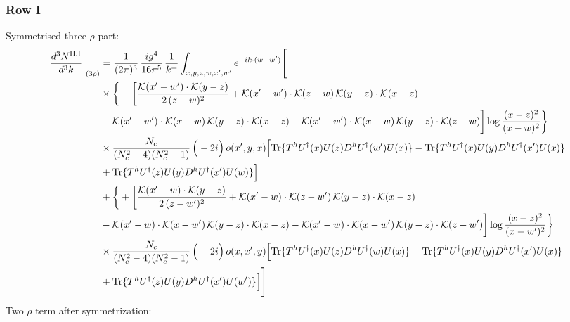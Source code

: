 \documentclass[9pt]{article}
\numberwithin{equation}{section}
\begin{document}
\subsubsection*{Row I}
Symmetrised three-$\rho$ part:
\begin{align}
\frac{d^{3}N^{\rm II.I}}{d^{3}k}\bigg|_{(3\rho)}&=\frac{1}{(2\pi)^{3}}\,\frac{ig^{4}}{16\pi^{5}}\,\frac{1}{k^{+}}\int_{x,y,z,w,x',w'}e^{-ik\cdot(w-w')}\Bigg[\notag\\
&\times\bigg\{-\bigg[\frac{\mathcal{K}(x'-w')\cdot\mathcal{K}(y-z)}{2\,(z-w)^{2}}+\mathcal{K}(x'-w')\cdot\mathcal{K}(z-w)\,\mathcal{K}(y-z)\cdot\mathcal{K}(x-z)\notag\\
&-\mathcal{K}(x'-w')\cdot\mathcal{K}(x-w)\,\mathcal{K}(y-z)\cdot\mathcal{K}(x-z)-\mathcal{K}(x'-w')\cdot\mathcal{K}(x-w)\,\mathcal{K}(y-z)\cdot\mathcal{K}(z-w)\bigg]\log\frac{(x-z)^{2}}{(x-w)^{2}}\bigg\}\notag\\
&\times \frac{N_{c}}{(N_{c}^{2}-4)(N_{c}^{2}-1)}\,\Big(-2i\Big)\,o(x',y,x)\Big[{\rm Tr}\{T^{h}U^{\dagger}(x)U(z)D^{h}U^{\dagger}(w')U(x)\}-{\rm Tr}\{T^{h}U^{\dagger}(x)U(y)D^{h}U^{\dagger}(x')U(x)\}\notag\\
& +{\rm Tr}\{T^{h}U^{\dagger}(z)U(y)D^{h}U^{\dagger}(x')U(w)\}\Big]\notag\\
&+\bigg\{+\bigg[\frac{\mathcal{K}(x'-w)\cdot\mathcal{K}(y-z)}{2\,(z-w')^{2}}+\mathcal{K}(x'-w)\cdot\mathcal{K}(z-w')\,\mathcal{K}(y-z)\cdot\mathcal{K}(x-z)\notag\\
&-\mathcal{K}(x'-w)\cdot\mathcal{K}(x-w')\,\mathcal{K}(y-z)\cdot\mathcal{K}(x-z)-\mathcal{K}(x'-w)\cdot\mathcal{K}(x-w')\,\mathcal{K}(y-z)\cdot\mathcal{K}(z-w')\bigg]\log\frac{(x-z)^{2}}{(x-w')^{2}}\bigg\}\notag\\
&\times \frac{N_{c}}{(N_{c}^{2}-4)(N_{c}^{2}-1)}\,\Big(-2i\Big)\,o(x,x',y)\Big[{\rm Tr}\{T^{h}U^{\dagger}(x)U(z)D^{h}U^{\dagger}(w)U(x)\}-{\rm Tr}\{T^{h}U^{\dagger}(x)U(y)D^{h}U^{\dagger}(x')U(x)\}\notag\\
& +{\rm Tr}\{T^{h}U^{\dagger}(z)U(y)D^{h}U^{\dagger}(x')U(w')\}\Big]\Bigg]\label{eq:E-II.I-3}
\end{align}
Two $\rho$ term after symmetrization:
\end{document}
